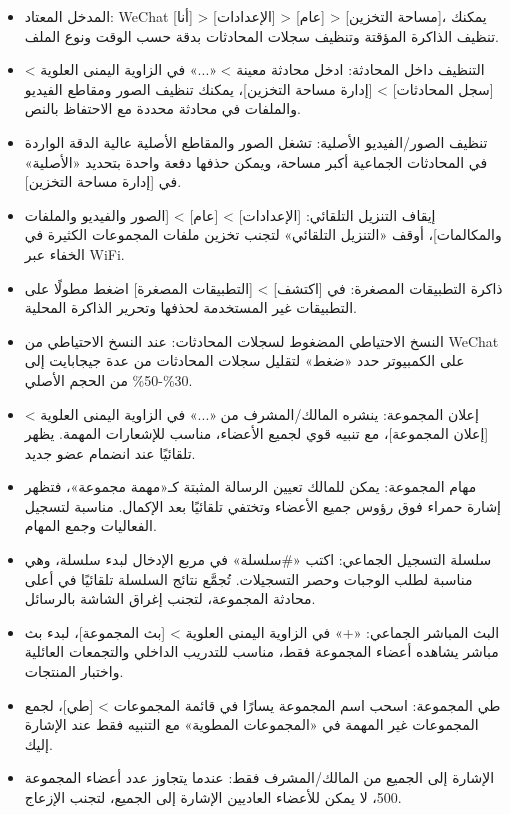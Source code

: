 \begin{itemize}
  \item المدخل المعتاد: WeChat [أنا] > [الإعدادات] > [عام] > [مساحة التخزين]، يمكنك تنظيف الذاكرة المؤقتة وتنظيف سجلات المحادثات بدقة حسب الوقت ونوع الملف.
  \item التنظيف داخل المحادثة: ادخل محادثة معينة > «...» في الزاوية اليمنى العلوية > [سجل المحادثات] > [إدارة مساحة التخزين]، يمكنك تنظيف الصور ومقاطع الفيديو والملفات في محادثة محددة مع الاحتفاظ بالنص.
  \item تنظيف الصور/الفيديو الأصلية: تشغل الصور والمقاطع الأصلية عالية الدقة الواردة في المحادثات الجماعية أكبر مساحة، ويمكن حذفها دفعة واحدة بتحديد «الأصلية» في [إدارة مساحة التخزين].
  \item إيقاف التنزيل التلقائي: [الإعدادات] > [عام] > [الصور والفيديو والملفات والمكالمات]، أوقف «التنزيل التلقائي» لتجنب تخزين ملفات المجموعات الكثيرة في الخفاء عبر WiFi.
  \item ذاكرة التطبيقات المصغرة: في [اكتشف] > [التطبيقات المصغرة] اضغط مطولًا على التطبيقات غير المستخدمة لحذفها وتحرير الذاكرة المحلية.
  \item النسخ الاحتياطي المضغوط لسجلات المحادثات: عند النسخ الاحتياطي من WeChat على الكمبيوتر حدد «ضغط» لتقليل سجلات المحادثات من عدة جيجابايت إلى 30\%-50\% من الحجم الأصلي.
\end{itemize}


\begin{itemize}
  \item إعلان المجموعة: ينشره المالك/المشرف من «...» في الزاوية اليمنى العلوية > [إعلان المجموعة]، مع تنبيه قوي لجميع الأعضاء، مناسب للإشعارات المهمة. يظهر تلقائيًا عند انضمام عضو جديد.
  \item مهام المجموعة: يمكن للمالك تعيين الرسالة المثبتة كـ«مهمة مجموعة»، فتظهر إشارة حمراء فوق رؤوس جميع الأعضاء وتختفي تلقائيًا بعد الإكمال. مناسبة لتسجيل الفعاليات وجمع المهام.
  \item سلسلة التسجيل الجماعي: اكتب «\#سلسلة» في مربع الإدخال لبدء سلسلة، وهي مناسبة لطلب الوجبات وحصر التسجيلات. تُجمَّع نتائج السلسلة تلقائيًا في أعلى محادثة المجموعة، لتجنب إغراق الشاشة بالرسائل.
  \item البث المباشر الجماعي: «+» في الزاوية اليمنى العلوية > [بث المجموعة]، لبدء بث مباشر يشاهده أعضاء المجموعة فقط، مناسب للتدريب الداخلي والتجمعات العائلية واختبار المنتجات.
  \item طي المجموعة: اسحب اسم المجموعة يسارًا في قائمة المجموعات > [طي]، لجمع المجموعات غير المهمة في «المجموعات المطوية» مع التنبيه فقط عند الإشارة إليك.
  \item الإشارة إلى الجميع من المالك/المشرف فقط: عندما يتجاوز عدد أعضاء المجموعة 500، لا يمكن للأعضاء العاديين الإشارة إلى الجميع، لتجنب الإزعاج.
\end{itemize}

